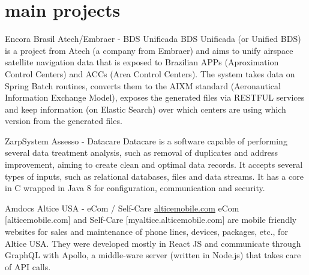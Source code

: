\documentclass[]{friggeri-cv}
\begin{document}
\section{main projects}

\begin{entrylist}
 \entry
    {Encora Brasil}
    {Atech/Embraer - BDS Unificada}
    {\href{}{}}
    {BDS Unificada (or Unified BDS) is a project from Atech (a company from Embraer) and aims to unify airspace satellite navigation data that is exposed to Brazilian APPs (Aproximation Control Centers) and ACCs (Area Control Centers). The system takes data on Spring Batch routines, converts them to the AIXM standard (Aeronautical Information Exchange Model), exposes the generated files via RESTFUL services and keep information (on Elastic Search) over which centers are using which version from the generated files.} 

\begin{comment}
 \entry
    {ZarpSystem}
    {OdontoPrev - Portal Parceiros}
    {\href{}{https://www.parceirosodontoprev.com.br}}
    {Parceiros is a website used by brokers of OdontoPrev (private dental care company) to sell its plans and manage commissioning. It uses basically Java 8/Spring Boot/Thymeleaf and REST communication, along with batch processes (Spring Batch). } 
\end{comment}

\entry
    {ZarpSystem}
    {Assesso - Datacare}
    {\href{}{}}
    {Datacare is a software capable of performing several data treatment analysis, such as removal of duplicates and address improvement, aiming to create clean and optimal data records. It accepts several types of inputs, such as relational databases, files and data streams. It has a core in C wrapped in Java 8 for configuration, communication and security.  } 
    
\entry
    {Amdocs}
    {Altice USA - eCom / Self-Care}
    {\href{eCom}{alticemobile.com}}
    {eCom [alticemobile.com] and Self-Care [myaltice.alticemobile.com] are mobile friendly websites for sales and maintenance of phone lines, devices, packages, etc., for Altice USA. They were developed mostly in React JS and communicate through GraphQL with Apollo, a middle-ware server (written in Node.js) that takes care of API calls.}


\end{entrylist}
\end{document}
